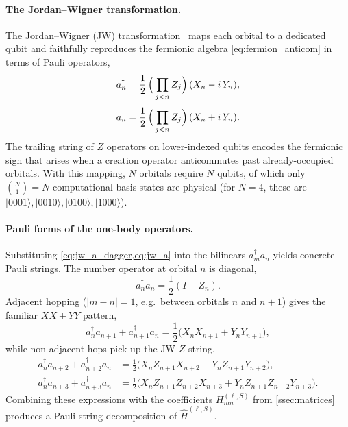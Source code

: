 \paragraph{The Jordan--Wigner transformation.}
The Jordan--Wigner (JW) transformation~\cite{nielsen2010} maps each orbital
to a dedicated qubit and faithfully reproduces the fermionic algebra
\cref{eq:fermion_anticom} in terms of Pauli operators,
\begin{align}
  \label{eq:jw_a_dagger}
  a_n^{\dagger} &=
    \frac{1}{2}\,\Bigl(\,\prod_{j<n} Z_j\Bigr)\,(X_n - i\,Y_n),\\[3pt]
  \label{eq:jw_a}
  a_n &=
    \frac{1}{2}\,\Bigl(\,\prod_{j<n} Z_j\Bigr)\,(X_n + i\,Y_n).
\end{align}
The trailing string of $Z$ operators on lower-indexed qubits encodes the
fermionic sign that arises when a creation operator anticommutes past
already-occupied orbitals. With this mapping, $N$ orbitals require $N$
qubits, of which only $\binom{N}{1}=N$ computational-basis states are
physical (for $N=4$, these are
$|0001\rangle,|0010\rangle,|0100\rangle,|1000\rangle$).

\paragraph{Pauli forms of the one-body operators.}
Substituting \cref{eq:jw_a_dagger,eq:jw_a} into the bilinears
$a_m^{\dagger} a_n$ yields concrete Pauli strings. The number operator at
orbital $n$ is diagonal,
\begin{equation}
  \label{eq:jw_number}
  a_n^{\dagger} a_n = \frac{1}{2}(I - Z_n).
\end{equation}
Adjacent hopping ($|m-n|=1$, e.g.\ between orbitals $n$ and $n+1$) gives the
familiar $XX{+}YY$ pattern,
\begin{equation}
  \label{eq:jw_adjacent}
  a_n^{\dagger} a_{n+1} + a_{n+1}^{\dagger} a_n
  = \frac{1}{2}\bigl(X_n X_{n+1} + Y_n Y_{n+1}\bigr),
\end{equation}
while non-adjacent hops pick up the JW $Z$-string,
\begin{align}
  \label{eq:jw_skip1}
  a_n^{\dagger} a_{n+2} + a_{n+2}^{\dagger} a_n
    &= \frac{1}{2}\bigl(X_n Z_{n+1} X_{n+2} + Y_n Z_{n+1} Y_{n+2}\bigr),\\
  \label{eq:jw_skip2}
  a_n^{\dagger} a_{n+3} + a_{n+3}^{\dagger} a_n
    &= \frac{1}{2}\bigl(X_n Z_{n+1} Z_{n+2} X_{n+3}
                       + Y_n Z_{n+1} Z_{n+2} Y_{n+3}\bigr).
\end{align}
Combining these expressions with the coefficients $H_{mn}^{(\ell,S)}$
from \cref{ssec:matrices} produces a Pauli-string decomposition of
$\widehat{H}^{(\ell,S)}$.

